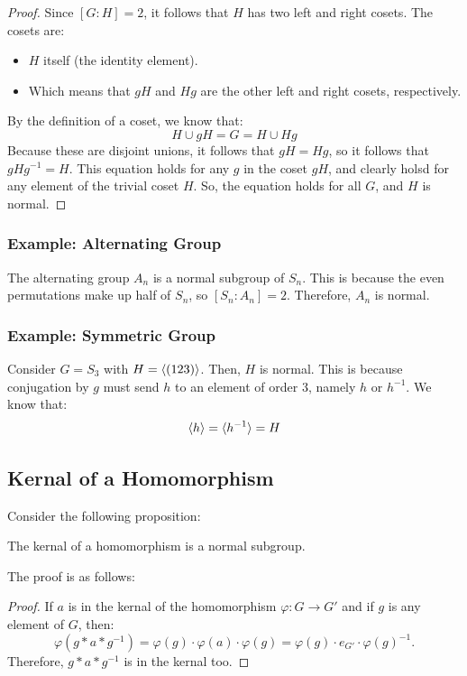 \documentclass[letterpaper]{article}
\begin{document}
\begin{mdframed}
    \begin{proof}
        Since $[G: H] = 2$, it follows that $H$ has two left and right cosets. The cosets are: 
        \begin{itemize}
            \item $H$ itself (the identity element).
            \item Which means that $gH$ and $Hg$ are the other left and right cosets, respectively.
        \end{itemize}
        By the definition of a coset, we know that: 
        \[H \cup gH = G = H \cup Hg\]
        Because these are disjoint unions, it follows that $gH = Hg$, so it follows that $gHg^{-1} = H$. This equation holds for any $g$ in the coset $gH$, and clearly holsd for any element of the trivial coset $H$. So, the equation holds for all $G$, and $H$ is normal. 
    \end{proof}
\end{mdframed}


\subsubsection{Example: Alternating Group}
The alternating group $A_n$ is a normal subgroup of $S_n$. This is because the even permutations make up half of $S_n$, so $[S_n: A_n] = 2$. Therefore, $A_n$ is normal. 


\subsubsection{Example: Symmetric Group}
Consider $G = S_3$ with $H = \langle (123) \rangle$. Then, $H$ is normal. This is because conjugation by $g$ must send $h$ to an element of order 3, namely $h$ or $h^{-1}$. We know that: 
\[\langle h \rangle = \langle h^{-1} \rangle = H\]

\subsection{Kernal of a Homomorphism}
Consider the following proposition: 
\begin{mdframed}
    \begin{proposition}
        The kernal of a homomorphism is a normal subgroup.
    \end{proposition}
\end{mdframed}

The proof is as follows: 
\begin{mdframed}
    \begin{proof}
        If $a$ is in the kernal of the homomorphism $\varphi: G \to G'$ and if $g$ is any element of $G$, then: 
        \[\varphi(g * a * g^{-1}) = \varphi(g) \cdot \varphi(a) \cdot \varphi(g) = \varphi(g) \cdot e_{G'} \cdot \varphi(g)^{-1}.\]
        Therefore, $g * a * g^{-1}$ is in the kernal too. 
    \end{proof}
\end{mdframed}
 
\end{document}
